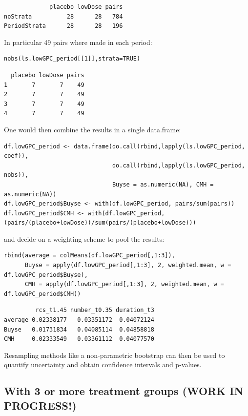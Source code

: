 \documentclass[12pt]{article}
\begin{document}
\begin{verbatim}
             placebo lowDose pairs
noStrata          28      28   784
PeriodStrata      28      28   196
\end{verbatim}


In particular 49 pairs where made in each period:
\lstset{language=r,label= ,caption= ,captionpos=b,numbers=none}
\begin{lstlisting}
nobs(ls.lowGPC_period[[1]],strata=TRUE)
\end{lstlisting}

\begin{verbatim}
  placebo lowDose pairs
1       7       7    49
2       7       7    49
3       7       7    49
4       7       7    49
\end{verbatim}


One would then combine the results in a single data.frame:
\lstset{language=r,label= ,caption= ,captionpos=b,numbers=none}
\begin{lstlisting}
df.lowGPC_period <- data.frame(do.call(rbind,lapply(ls.lowGPC_period, coef)),
                               do.call(rbind,lapply(ls.lowGPC_period, nobs)),
                               Buyse = as.numeric(NA), CMH = as.numeric(NA))
df.lowGPC_period$Buyse <- with(df.lowGPC_period, pairs/sum(pairs))
df.lowGPC_period$CMH <- with(df.lowGPC_period, (pairs/(placebo+lowDose))/sum(pairs/(placebo+lowDose)))
\end{lstlisting}

and decide on a weighting scheme to pool the results:
\lstset{language=r,label= ,caption= ,captionpos=b,numbers=none}
\begin{lstlisting}
rbind(average = colMeans(df.lowGPC_period[,1:3]),
      Buyse = apply(df.lowGPC_period[,1:3], 2, weighted.mean, w = df.lowGPC_period$Buyse),
      CMH = apply(df.lowGPC_period[,1:3], 2, weighted.mean, w = df.lowGPC_period$CMH))
\end{lstlisting}

\begin{verbatim}
         rcs_t1.45 number_t0.35 duration_t3
average 0.02338177   0.03351172  0.04072124
Buyse   0.01731834   0.04085114  0.04858818
CMH     0.02333549   0.03361112  0.04077570
\end{verbatim}


Resampling methods like a non-parametric bootstrap can then be used to
quantify uncertainty and obtain confidence intervals and p-values.

\clearpage

\subsection{With 3 or more treatment groups (WORK IN PROGRESS!)}
\label{sec:org6937095}
\end{document}
